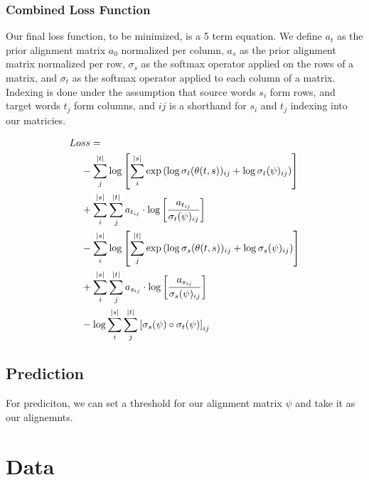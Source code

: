 \documentclass[twoside,twocolumn]{article}
\begin{document}
\subsubsection{Combined Loss Function}
Our final loss function, to be minimized, is a 5 term equation. We define $a_t$ as the prior alignment matrix $a_0$ normalized per column, $a_s$ as the prior alignment matrix normalized per row, $\sigma_s$ as the softmax operator applied on the rows of a matrix, and $\sigma_t$ as the softmax operator applied to each column of a matrix. Indexing is done under the assumption that source words $s_i$ form rows, and target words $t_j$ form columns, and $ij$ is a shorthand for $s_i$ and $t_j$ indexing into our matricies.

\begin{equation}
  \centering
\begin{split}
  Lo&ss = \\
  &- \sum_j^{|t|} \log \left[ \sum_i^{|s|} \exp \left( \log \sigma_t(\theta(t, s))_{ij} + \log \sigma_t(\psi)_{ij} \right) \right] \\
  &+ \sum_i^{|s|} \sum_j^{|t|} a_{t_{ij}} \cdot \log \left[ \frac{a_{t_{ij}}}{\sigma_t(\psi)_{ij}} \right] \\
  &- \sum_i^{|s|} \log \left[ \sum_j^{|t|} \exp \left( \log \sigma_s(\theta(t, s))_{ij} + \log \sigma_s(\psi)_{ij} \right) \right] \\
  &+ \sum_i^{|s|} \sum_j^{|t|} a_{s_{ij}} \cdot \log \left[ \frac{a_{s_{ij}}}{\sigma_s(\psi)_{ij}} \right] \\
  &- \log \sum_i^{|s|} \sum_j^{|t|} \left[ \sigma_s(\psi) \circ \sigma_t(\psi) \right]_{ij} \\
\end{split}
\end{equation}

\subsection{Prediction}

For prediciton, we can set a threshold for our alignment matrix $\psi$ and take it as our alignemnts.

\section{Data}
\end{document}
